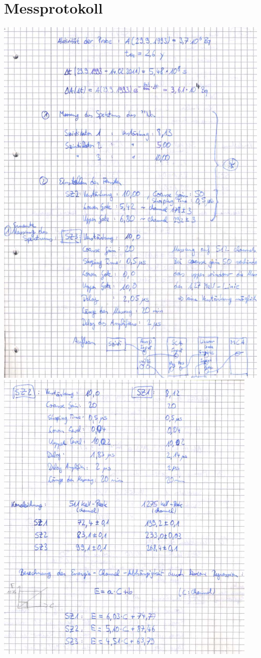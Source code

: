 \appendix
\section{Messprotokoll}
\includegraphics[scale=0.55]{Messprotokoll/0001.jpeg}
\clearpage
\includegraphics[width=0.95\textwidth]{Messprotokoll/0002.jpeg}
